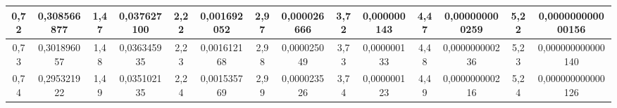 \documentclass[a4paper,8pt]{article}
\begin{document}
\begin{table}[!ht]
{\begin{tabular}{|c|c||c|c||c|c||c|c||c|c||c|c||c|c||}
        0,72 & 0,308566877 & 1,47 & 0,037627100 & 2,22 & 0,001692052 & 2,97 & 0,000026666 & 3,72 & 0,000000143 & 4,47 & 0,000000000259 & 5,22 & 0,000000000000156 \\ \hline
        0,73 & 0,301896057 & 1,48 & 0,036345935 & 2,23 & 0,001612168 & 2,98 & 0,000025049 & 3,73 & 0,000000133 & 4,48 & 0,000000000236 & 5,23 & 0,000000000000140 \\ \hline
        0,74 & 0,295321922 & 1,49 & 0,035102135 & 2,24 & 0,001535769 & 2,99 & 0,000023526 & 3,74 & 0,000000123 & 4,49 & 0,000000000216 & 5,24 & 0,000000000000126 \\ \hline
    \end{tabular}
    }
\end{table}

\vspace{-2.25em}
\renewcommand*{\thefootnote}{\fnsymbol{footnote}}
\renewcommand*{\thefootnote}{\arabic{footnote}}
\end{document}
